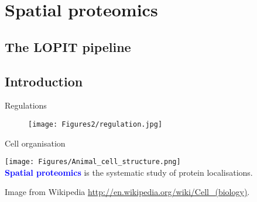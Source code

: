 \section{Spatial proteomics}

\subsection{The LOPIT pipeline}

\subsection*{Introduction}
\label{sec:spintro}

\begin{frame}{Regulations}
  \begin{figure}[h]
    \centering
    \texttt{[image: Figures2/regulation.jpg]}
  \end{figure}
\end{frame}

\label{sec:spspatprot}

\begin{frame}{Cell organisation}
  \begin{center}
    \texttt{[image: Figures/Animal\_cell\_structure.png]} \\
    \textbf{\textcolor{Blue}{Spatial proteomics}} is the systematic
    study of protein localisations.
  \end{center}

  \tiny Image from Wikipedia
  \url{http://en.wikipedia.org/wiki/Cell_(biology)}.
\end{frame}

 
